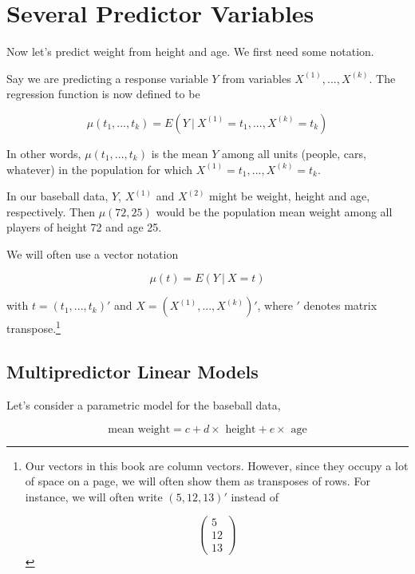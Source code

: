 \section{Several Predictor Variables}

Now let's predict weight from height and age.  We first need some
notation.

Say we are predicting a response variable $Y$ from variables
$X^{(1)},...,X^{(k)}$.  The regression function is now defined to be

\begin{equation}
\mu(t_1,...,t_k) =
E(Y ~|~ X^{(1)} = t_1,...,
        X^{(k)} = t_k)
\end{equation}

In other words, $\mu(t_1,...,t_k)$ is the mean $Y$ among all units
(people, cars, whatever) in the population for which
$X^{(1)} = t_1,..., X^{(k)} = t_k$.

In our baseball data, $Y$, $X^{(1)}$ and $X^{(2)}$ might be
weight, height and age, respectively.  Then $\mu(72,25)$ would be the
population mean weight among all players of height 72 and age 25.

We will often use a vector notation

\begin{equation}
\mu(t) =
E(Y ~|~ X = t)
\end{equation}

with $t = (t_1,...,t_k)'$ and $X = (X^{(1)},...,X^{(k)})'$, where $'$
denotes matrix transpose.\footnote{Our vectors in this book are column
vectors.  However, since they occupy a lot of space on a page, we will
often show them as transposes of rows.  For instance, we will often write
$(5,12,13)'$ instead of

\begin{equation}
\left (
\begin{array}{r}
5 \\
12 \\
13
\end{array}
\right )
\end{equation}}

\subsection{Multipredictor Linear Models}

Let's consider a parametric model for the baseball data,

\begin{equation}
\label{meanwthtage}
\textrm{mean weight} = c + d \times \textrm{ height} + e \times
\textrm{ age}
\end{equation}

